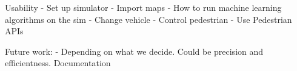 Usability
    - Set up simulator
    - Import maps
    - How to run machine learning algorithms on the sim
    - Change vehicle
    - Control pedestrian
    - Use Pedestrian APIs
    
Future work:
    - Depending on what we decide. Could be precision and efficientness. 
Documentation

